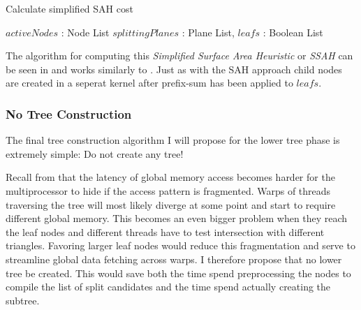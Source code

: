 \begin{algorithm}
  \caption{Calculate simplified SAH cost}
  \label{alg:calcBalancedCost}
  \begin{algorithmic}
              {$activeNodes$ : Node List}
              {$splittingPlanes$ : Plane List, $leafs$ : Boolean List}{
                  \ENDFOR
                \ENDFOR
              }
  \end{algorithmic}
\end{algorithm}


The algorithm for computing this \textit{Simplified Surface Area
  Heuristic} or \textit{SSAH} can be seen in
 and works similarly to
. Just as with the SAH approach child nodes
are created in a seperat kernel after prefix-sum has been applied to
$leafs$.

\subsubsection{No Tree Construction}

The final tree construction algorithm I will propose for the lower
tree phase is extremely simple: Do not create any tree!

Recall from  that the latency of global
memory access becomes harder for the multiprocessor to hide if the
access pattern is fragmented. Warps of threads traversing the tree
will most likely diverge at some point and start to require different
global memory. This becomes an even bigger problem when they reach the
leaf nodes and different threads have to test intersection with
different triangles. Favoring larger leaf nodes would reduce this
fragmentation and serve to streamline global data fetching across
warps. I therefore propose that no lower tree be created. This would
save both the time spend preprocessing the nodes to compile the list
of split candidates and the time spend actually creating the subtree.




